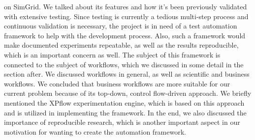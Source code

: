 on SimGrid. We talked about its features and how it's been previously
validated with extensive testing. Since testing is currently a tedious
multi-step process and continuous validation is necessary, the project
is in need of a test automation framework to help with the development
process. Also, such a framework would make documented experiments
repeatable, as well as the results reproducible, which is an important
concern as well. The subject of this framework is connected to the
subject of workflows, which we discussed in some detail in the section
after. We discussed workflows in general, as well as scientific and
business workflows. We concluded that business workflows are more
suitable for our current problem because of its top-down, control
flow-driven approach. We briefly mentioned the XPflow experimentation
engine, which is based on this approach and is utilized in
implementing the framework. In the end, we also discussed the
importance of reproducible research, which is another important aspect
in our motivation for wanting to create the automation framework.

